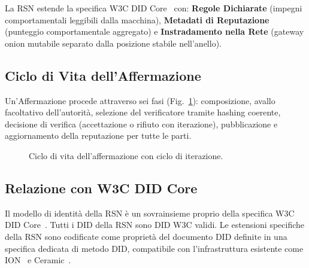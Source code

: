 \documentclass[11pt,a4paper,twocolumn]{article}
\begin{document}
La RSN estende la specifica W3C DID Core~\cite{did2022} con: \textbf{Regole Dichiarate} (impegni comportamentali leggibili dalla macchina), \textbf{Metadati di Reputazione} (punteggio comportamentale aggregato) e \textbf{Instradamento nella Rete} (gateway onion mutabile separato dalla posizione stabile nell'anello).

\subsection{Ciclo di Vita dell'Affermazione}

Un'Affermazione procede attraverso sei fasi (Fig.~\ref{fig:lifecycle}): composizione, avallo facoltativo dell'autorità, selezione del verificatore tramite hashing coerente, decisione di verifica (accettazione o rifiuto con iterazione), pubblicazione e aggiornamento della reputazione per tutte le parti.

\begin{figure}[ht]
\centering
{}
\caption{Ciclo di vita dell'affermazione con ciclo di iterazione.}
\label{fig:lifecycle}
\end{figure}

\subsection{Relazione con W3C DID Core}

Il modello di identità della RSN è un sovrainsieme proprio della specifica W3C DID Core~\cite{did2022}. Tutti i DID della RSN sono DID W3C validi. Le estensioni specifiche della RSN sono codificate come proprietà del documento DID definite in una specifica dedicata di metodo DID, compatibile con l'infrastruttura esistente come ION~\cite{buchner2021} e Ceramic~\cite{ceramic2023}.
\end{document}
